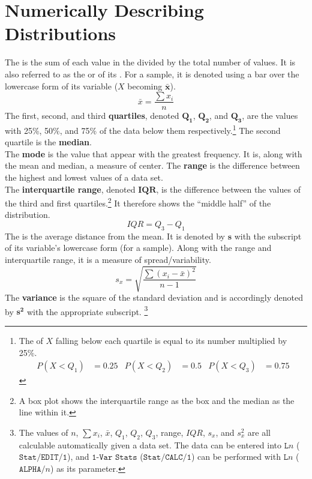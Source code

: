 \documentclass[../AP_Statistics.tex]{subfiles}
\begin{document}
		\section{Numerically Describing Distributions}
			The  is the sum of each value in the  divided by the total number of values. It is also referred to as the  or  of its . For a sample, it is denoted using a bar over the lowercase form of its variable ($X$ becoming $\pmb{\bar{x}}$).
			\[\bar{x} = \frac{\sum x_i}{n}\]
			The first, second, and third \textbf{quartiles}, denoted $\pmb{Q_1}$, $\pmb{Q_2}$, and $\pmb{Q_3}$, are the values with 25\%, 50\%, and 75\% of the data below them respectively.\footnote{The  of $X$ falling below each quartile is equal to its number multiplied by 25\%. \begin{align*} P(X < Q_1) &= 0.25 & P(X < Q_2) &= 0.5 & P(X < Q_3) &= 0.75\end{align*}} The second quartile is the \textbf{median}. \\
			The \textbf{mode} is the value that appear with the greatest frequency. It is, along with the mean and median, a measure of center.
			The \textbf{range} is the difference between the highest and lowest values of a data set. \\
			The \textbf{interquartile range}, denoted $\pmb{IQR}$, is the difference between the values of the third and first quartiles.\footnote{A box plot shows the interquartile range as the box and the median as the line within it.} It therefore shows the \enquote{middle half} of the distribution.
			\[IQR = Q_3 - Q_1\]
			The  is the average distance from the mean. It is denoted by $\pmb{s}$  with the subscript of its variable's lowercase form (for a sample). Along with the range and interquartile range, it is a measure of spread/variability.
			\[s_x = \sqrt{\frac{\sum (x_i - \bar{x})^2}{n - 1}}\]
			The \textbf{variance} is the square of the standard deviation and is accordingly denoted by $\pmb{s^2}$ with the appropriate subscript. \footnote{The values of $n$, $\sum x_i$, $\bar{x}$, $Q_1$, $Q_2$, $Q_3$,  range, $IQR$, $s_x$, and $s_x^2$ are all calculable automatically given a data set. The data can be entered into $\texttt{L}n$ ($\texttt{Stat/EDIT/1}$), and $\texttt{1-Var Stats}$ ($\texttt{Stat/CALC/1}$) can be performed with $\texttt{L}n$ ($\texttt{ALPHA/}n$) as its parameter.} \\
\end{document}
